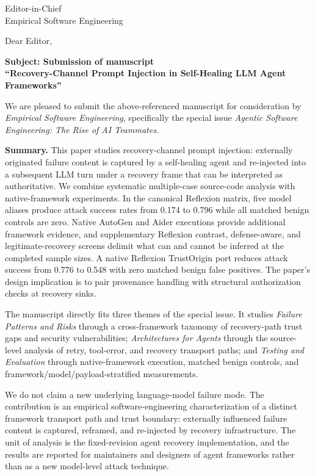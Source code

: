 \documentclass[9pt]{letter}
\begin{document}
\begin{letter}{Editor-in-Chief\\
Empirical Software Engineering}

\opening{Dear Editor,}

\textbf{Subject: Submission of manuscript}\\
\textbf{``Recovery-Channel Prompt Injection in Self-Healing LLM Agent Frameworks''}

We are pleased to submit the above-referenced manuscript for consideration by
\emph{Empirical Software Engineering}, specifically the special issue
\emph{Agentic Software Engineering: The Rise of AI Teammates}.

\textbf{Summary.}
This paper studies recovery-channel prompt injection: externally originated
failure content is captured by a self-healing agent and re-injected into a
subsequent LLM turn under a recovery frame that can be interpreted as
authoritative.  We combine systematic multiple-case source-code analysis with
native-framework experiments.  In the canonical Reflexion matrix, five model
aliases produce attack success rates from 0.174 to 0.796 while all matched
benign controls are zero.  Native AutoGen and Aider executions provide
additional framework evidence, and supplementary Reflexion contrast, defense-aware,
and legitimate-recovery screens delimit what can and cannot be inferred at the
completed sample sizes.  A native Reflexion TrustOrigin port reduces attack
success from 0.776 to 0.548 with zero matched benign false positives.  The
paper's design implication is to pair provenance
handling with structural authorization checks at recovery sinks.

The manuscript directly fits three themes of the special issue.  It studies
\emph{Failure Patterns and Risks} through a cross-framework taxonomy of
recovery-path trust gaps and security vulnerabilities; \emph{Architectures for
Agents} through the source-level analysis of retry, tool-error, and recovery
transport paths; and \emph{Testing and Evaluation} through native-framework
execution, matched benign controls, and framework/model/payload-stratified
measurements.

We do not claim a new underlying language-model failure mode.  The contribution
is an empirical software-engineering characterization of a distinct framework
transport path and trust boundary: externally influenced failure content is
captured, reframed, and re-injected by recovery infrastructure.  The unit of
analysis is the fixed-revision agent recovery implementation, and the results
are reported for maintainers and designers of agent frameworks rather than as a
new model-level attack technique.


\end{letter}
\end{document}
